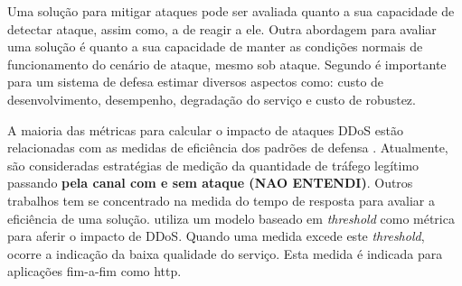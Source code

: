 

%
Uma solução para mitigar ataques pode ser avaliada quanto a sua capacidade de detectar ataque, assim como, a de reagir a ele. Outra abordagem para avaliar uma solução é quanto a sua capacidade de manter as condições normais de funcionamento do cenário de ataque, mesmo sob ataque. Segundo \cite{4600003} é importante para um sistema de defesa estimar diversos aspectos como: custo de desenvolvimento, desempenho, degradação do serviço e custo de robustez. 

A maioria das métricas para calcular o impacto de ataques DDoS estão relacionadas com as medidas de eficiência dos padrões de defensa \cite{4809152}. Atualmente, são consideradas estratégias de medição da quantidade de tráfego legítimo passando \textbf{pela canal com e sem ataque (NAO ENTENDI)}. Outros trabalhos tem se concentrado na medida do tempo de resposta para avaliar a eficiência de uma solução. \cite{Mirkovic:2007:TUM:1281700.1281708} utiliza um modelo baseado em \emph{threshold} como métrica para aferir o impacto de DDoS. Quando uma medida excede este \emph{threshold}, ocorre a  indicação da baixa qualidade do serviço. Esta medida é indicada para aplicações fim-a-fim como http.


